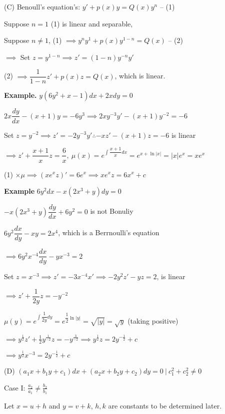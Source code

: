 (C) Benoull's equation's: $y' + p(x)y = Q(x)y^n$ -- (1)

Suppose $n = 1$ (1) is linear and separable,

Suppose $n \neq 1$, (1) $\implies y^ny^1 + p(x)y^{1-n} = Q(x)$ -- (2)

$\implies $ Set $z = y^{1-n} \implies z' = (1-n)y^{-n}y'$

(2) $\implies \dfrac{1}{1-n}z' + p(x)z = Q(x)$, which is linear.

\textbf{Example.} $y(6y^2 + x -1)dx + 2xdy = 0$

\begin{solution}
	$2x\dfrac{dy}{dx} - (x+1)y = -6y^3 \implies 2xy^{-3}y' - (x+1)y^{-2} = -6$
	
	Set $z = y^{-2} \implies z' = -2y^{-3}y' \therefore -xz' - (x+1)z = -6$ is linear
	
	$\implies z' + \dfrac{x+1}{x}z = \dfrac{6}{x},~\mu(x) = e^{\int \dfrac{x+1}{x}dx} = e^{x + \ln|x|} = |x|e^x = xe^x$
	
	(1) $\times \mu \implies (xe^xz)' = 6e^x \implies xe^xz = 6x^x + c$
\end{solution}


\textbf{Example} $6y^2 dx - x(2x^3 + y)dy = 0$

\begin{solution}
	$-x(2x^3 + y)\dfrac{dy}{dx} + 6y^2 = 0$ is not Bonuliy
	
	$6y^2 \dfrac{dx}{dy} - xy = 2x^4$, which is a Berrnoulli's equation
	
	$\implies 6y^2x^{-4}\dfrac{dx}{dy} - yx^{-3} = 2$
	
	Set $z = x^{-3} \implies z' = -3x^{-4}x' \implies -2y^2z' - yz = 2$, is linear
	
	$\implies z' + \dfrac{1}{2y}z = -y^{-2}$
	
	$\mu(y) = e^{\int \dfrac{1}{2y}dy} = e^{\dfrac{1}{2}\ln|y|} = \sqrt{|y|} = \sqrt{y}$ (taking positive)
	
	$\implies y^{\frac{1}{2}}z' + \frac{1}{2}y^{\frac{1}{-2}}z = -y^{\frac{3}{-2}} \implies y^{\frac{1}{2}}z = 2y^{-\frac{1}{2}} + c $
	
	$\implies y^{\frac{1}{2}}x^{-3} = 2y^{-\frac{1}{2}} + c$
\end{solution}

(D) $(a_1x+b_1y+c_1)dx + (a_2x+b_2y+c_2)dy = 0~|~c_1^2+c_2^2 \neq 0$

Case I: $\frac{a_2}{a_1} \neq \frac{b_2}{b_1}$

Let $x = u+h$ and $y = v + k$, $h,k$ are constants to be determined later.

